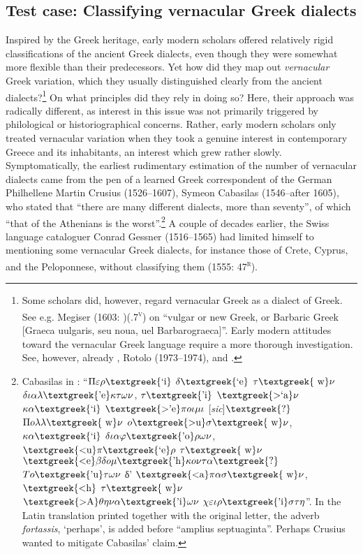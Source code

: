 \subsection{Test case: Classifying vernacular Greek dialects}
\hypertarget{Toc19704816}{}
Inspired by the Greek heritage, early modern scholars offered relatively rigid classifications of the ancient Greek dialects, even though they were somewhat more flexible than their predecessors. Yet how did they map out \textit{vernacular} Greek variation, which they usually distinguished clearly from the ancient dialects?\footnote{Some scholars did, however, regard vernacular Greek as a dialect of Greek. See e.g. Megiser (1603: )(.7\textsc{\textsuperscript{v}}) on “vulgar or new Greek, or Barbaric Greek [Graeca uulgaris, seu noua, uel Barbarograeca]”. Early modern attitudes toward the vernacular Greek language require a more thorough investigation. See, however, already \citet{Caratzas1952}, Rotolo (1973–1974), and \citet{Toufexis2005}.} On what principles did they rely in doing so? Here, their approach was radically different, as interest in this issue was not primarily triggered by philological or historiographical concerns. Rather, early modern scholars only treated vernacular variation when they took a genuine interest in contemporary Greece and its inhabitants, an interest which grew rather slowly. Symptomatically, the earliest rudimentary estimation of the number of vernacular dialects came from the pen of a learned Greek correspondent of the German Philhellene Martin Crusius (1526–1607), Symeon Cabasilas (1546–after 1605), who stated that “there are many different dialects, more than seventy”, of which “that of the Athenians is the worst”.\footnote{Cabasilas in \citet[461]{Crusius1584}: “$\Pi \varepsilon \rho \text{\textgreek{`i}}$ $\delta \text{\textgreek{`e}}$ $\tau \text{\textgreek{~w}}\nu $ $\delta \iota \alpha \lambda \text{\textgreek{'e}}\kappa \tau \omega \nu $, $\tau \text{\textgreek{'i}}$ $\text{\textgreek{>`a}}\nu $ $\kappa \alpha \text{\textgreek{`i}}$ $\text{\textgreek{>'e}}\pi o\iota \mu \iota $ [\textit{sic}]$\text{\textgreek{?}}$ $\Pi o\lambda \lambda \text{\textgreek{~w}}\nu $ $o\text{\textgreek{>u}}\sigma \text{\textgreek{~w}}\nu $, $\kappa \alpha \text{\textgreek{`i}}$ $\delta \iota \alpha \varphi \text{\textgreek{'o}}\rho \omega \nu $, $\text{\textgreek{<u}}\pi \text{\textgreek{`e}}\rho $ $\tau \text{\textgreek{~w}}\nu $ $\text{\textgreek{<e}}\beta \delta o\mu \text{\textgreek{'h}}\kappa o\nu \tau \alpha \text{\textgreek{?}}$ $To\text{\textgreek{'u}}\tau \omega \nu $ δ' $\text{\textgreek{<a}}\pi \alpha \sigma \text{\textgreek{~w}}\nu $, $\text{\textgreek{<h}}$ $\tau \text{\textgreek{~w}}\nu $ $\text{\textgreek{>A}}\theta \eta \nu \alpha \text{\textgreek{'i}}\omega \nu $ $\chi \varepsilon \iota \rho \text{\textgreek{'i}}\sigma \tau \eta $”. In the Latin translation printed together with the original letter, the adverb \textit{fortassis}, ‘perhaps’, is added before “amplius septuaginta”. Perhaps Crusius wanted to mitigate Cabasilas’ claim.} A couple of decades earlier, the Swiss language cataloguer Conrad Gessner (1516–1565) had limited himself to mentioning some vernacular Greek dialects, for instance those of Crete, Cyprus, and the Peloponnese, without classifying them (1555: 47\textsc{\textsuperscript{r}}).

